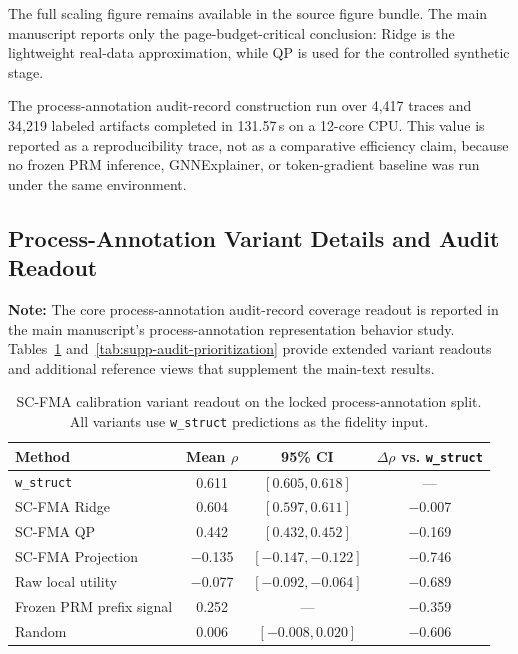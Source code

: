 \documentclass[a4paper,fleqn]{cas-sc}
\begin{document}
The full scaling figure remains available in the source figure bundle. The main manuscript reports only the page-budget-critical conclusion: Ridge is the lightweight real-data approximation, while QP is used for the controlled synthetic stage.

The process-annotation audit-record construction run over 4,417 traces and 34,219 labeled artifacts completed in 131.57\,s on a 12-core CPU. This value is reported as a reproducibility trace, not as a comparative efficiency claim, because no frozen PRM inference, GNNExplainer, or token-gradient baseline was run under the same environment.

\subsection{Process-Annotation Variant Details and Audit Readout}
\label{app:prm800k-variant-details}

\noindent\textbf{Note:} The core process-annotation audit-record coverage readout is reported in the main manuscript's process-annotation representation behavior study. Tables~\ref{tab:supp-scfma-variants} and~\ref{tab:supp-audit-prioritization} provide extended variant readouts and additional reference views that supplement the main-text results.

\begin{table}[ht]
\caption{SC-FMA calibration variant readout on the locked process-annotation split. All variants use \texttt{w\_struct} predictions as the fidelity input.}
\label{tab:supp-scfma-variants}
\centering
\small
\begin{tabular}{lccc}
\toprule
\textbf{Method} & \textbf{Mean $\rho$} & \textbf{95\% CI} & \textbf{$\Delta\rho$ vs. \texttt{w\_struct}} \\
\midrule
\texttt{w\_struct} & 0.611 & $[0.605,0.618]$ & --- \\
SC-FMA Ridge & 0.604 & $[0.597,0.611]$ & $-$0.007 \\
SC-FMA QP & 0.442 & $[0.432,0.452]$ & $-$0.169 \\
SC-FMA Projection & $-$0.135 & $[-0.147,-0.122]$ & $-$0.746 \\
Raw local utility & $-$0.077 & $[-0.092,-0.064]$ & $-$0.689 \\
Frozen PRM prefix signal & 0.252 & --- & $-$0.359 \\
Random & 0.006 & $[-0.008,0.020]$ & $-$0.606 \\
\bottomrule
\end{tabular}
\end{table}
\end{document}
